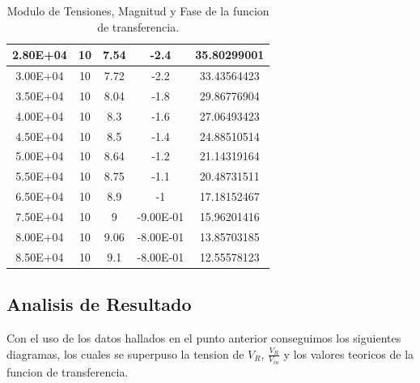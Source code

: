 \begin{table}[!htb]
\begin{tabular}{|c|c|c|c|c|}
2.80E+04  & 10    & 7.54     & -2.4            & 35.80299001         \\ \hline
3.00E+04  & 10    & 7.72     & -2.2            & 33.43564423         \\ \hline
3.50E+04  & 10    & 8.04     & -1.8            & 29.86776904         \\ \hline
4.00E+04  & 10    & 8.3      & -1.6            & 27.06493423         \\ \hline
4.50E+04  & 10    & 8.5      & -1.4            & 24.88510514         \\ \hline
5.00E+04  & 10    & 8.64     & -1.2            & 21.14319164         \\ \hline
5.50E+04  & 10    & 8.75     & -1.1            & 20.48731511         \\ \hline
6.50E+04  & 10    & 8.9      & -1              & 17.18152467         \\ \hline
7.50E+04  & 10    & 9        & -9.00E-01       & 15.96201416         \\ \hline
8.00E+04  & 10    & 9.06     & -8.00E-01       & 13.85703185         \\ \hline
8.50E+04  & 10    & 9.1      & -8.00E-01       & 12.55578123         \\ \hline
\end{tabular}
\caption{Modulo de Tensiones, Magnitud y Fase de la funcion de transferencia.}
\end{table}

\subsection{Analisis de Resultado}

Con el uso de los datos hallados en el punto anterior conseguimos los siguientes diagramas, los cuales se superpuso la tension de $V_R$, $\frac{V_R}{V_{in}}$ y los valores teoricos de la funcion de transferencia. 

